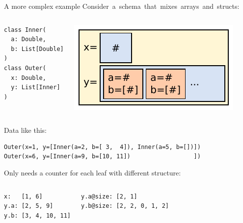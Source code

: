 \documentclass{beamer}
\begin{document}
\begin{frame}[fragile]{A more complex example}
\vspace{0.5 cm}
\mbox{\hspace{-0.5 cm}Consider a schema that mixes arrays and structs:}
\begin{columns}
\scriptsize
\begin{verbatim}
class Inner(
  a: Double,
  b: List[Double]
)
class Outer(
  x: Double,
  y: List[Inner]
)
\end{verbatim}

\includegraphics[width=\linewidth]{record.pdf}
\end{columns}

\vspace{0.3 cm}
{\hspace{-0.5 cm}\begin{minipage}{\linewidth}
{\normalsize Data like this:}

\small
\begin{verbatim}
Outer(x=1, y=[Inner(a=2, b=[ 3,  4]), Inner(a=5, b=[])])
Outer(x=6, y=[Inner(a=9, b=[10, 11])                  ])
\end{verbatim}

\vspace{0.2 cm}
{\normalsize Only needs a counter for each leaf with different structure:}

\vspace{-0.2 cm}
\begin{columns}[b]
\small
\begin{verbatim}
x:   [1, 6]
y.a: [2, 5, 9]
y.b: [3, 4, 10, 11]
\end{verbatim}

\small
\begin{verbatim}
y.a@size: [2, 1]
y.b@size: [2, 2, 0, 1, 2]
\end{verbatim}
\end{columns}
\end{minipage}}
\end{frame}


\end{document}
